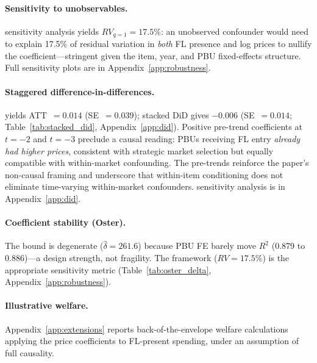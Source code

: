 \paragraph{Sensitivity to unobservables.}
\citet{cinelli2020making} sensitivity analysis yields $RV_{q=1} =
17.5\%$: an unobserved confounder would need to explain 17.5\% of
residual variation in \emph{both} FL presence and log prices to nullify
the coefficient---stringent given the item, year, and PBU fixed-effects
structure. Full sensitivity plots are in
Appendix~\ref{app:robustness}.


\paragraph{Staggered difference-in-differences.}
\citet{callaway2021difference} yields ATT~$= 0.014$ (SE~$= 0.039$);
stacked DiD \citep{cengiz2019effect} gives $-0.006$ (SE~$= 0.014$;
Table~\ref{tab:stacked_did}, Appendix~\ref{app:did}). Positive
pre-trend coefficients at $t = -2$ and $t = -3$ preclude a causal
reading: PBUs receiving FL entry \emph{already had higher prices},
consistent with strategic market selection but equally compatible
with within-market confounding. The pre-trends reinforce the paper's
non-causal framing and underscore that within-item conditioning does
not eliminate time-varying within-market confounders.
\citet{rambachan2023more} sensitivity analysis is in
Appendix~\ref{app:did}.

\paragraph{Coefficient stability (Oster).}
The \citet{oster2019unobservable} bound is degenerate
($\hat{\delta} = 261.6$) because PBU FE barely move $R^2$
(0.879 to 0.886)---a design strength, not fragility. The
\citet{cinelli2020making} framework ($RV = 17.5\%$) is the
appropriate sensitivity metric
(Table~\ref{tab:oster_delta}, Appendix~\ref{app:robustness}).


\paragraph{Illustrative welfare.}
Appendix~\ref{app:extensions} reports back-of-the-envelope welfare
calculations applying the price coefficients to FL-present spending,
under an assumption of full causality.


